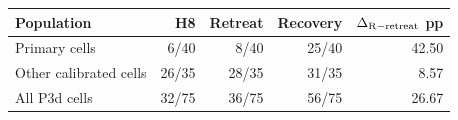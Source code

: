 \begin{tabular}{lrrrr}
\toprule
Population & H8 & Retreat & Recovery & $\Delta_{\rm R-retreat}$ pp \\
\midrule
Primary cells & 6/40 & 8/40 & 25/40 & 42.50 \\
Other calibrated cells & 26/35 & 28/35 & 31/35 & 8.57 \\
All P3d cells & 32/75 & 36/75 & 56/75 & 26.67 \\
\bottomrule
\end{tabular}
